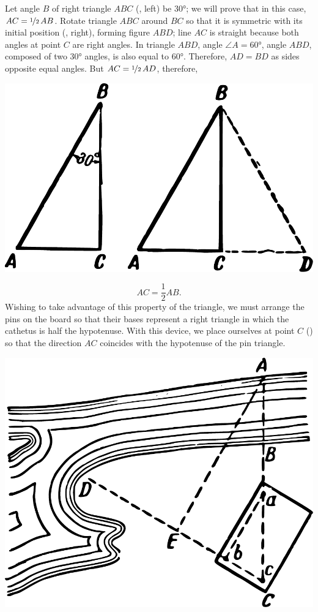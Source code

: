 \begin{enumerate}
Let angle $B$ of right triangle $ABC$ (, left) be \ang{30}; we will prove that in this case, $AC = \nicefrac{1}{2}\, AB$. Rotate triangle $ABC$ around $BC$ so that it is symmetric with its initial position (, right), forming figure $ABD$; line $AC$ is straight because both angles at point $C$ are right angles. In triangle $ABD$, angle $\angle A = \ang{60}$, angle $ABD$, composed of two \ang{30} angles, is also equal to \ang{60}. Therefore, $AD = BD$ as sides opposite equal angles. But $AC = \nicefrac{1}{2} \,AD$, therefore,
\begin{marginfigure}[-3cm]%
\centering
\includegraphics[width=\textwidth]{figures/ch-02/fig-030.pdf}
\end{marginfigure}
\begin{equation*}%
AC = \frac{1}{2} AB.
\end{equation*}
Wishing to take advantage of this property of the triangle, we must arrange the pins on the board so that their bases represent a right triangle in which the cathetus is half the hypotenuse. With this device, we place ourselves at point $C$ () so that the direction $AC$ coincides with the hypotenuse of the pin triangle. 
\begin{marginfigure}[-2cm]%
\centering
\includegraphics[width=\textwidth]{figures/ch-02/fig-031.pdf}

\end{marginfigure}
\end{enumerate}
